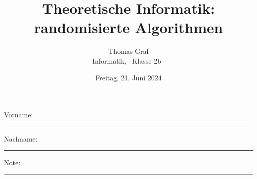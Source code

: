 \newtoggle{withbonus}  %

\newcommand{\mycourse}{Informatik}
\newcommand{\myclass}{\faPeace\faIceCream~Klasse 2b~\faIceCream\faPeace}
\newcommand{\mydate}{Freitag, 21. Juni 2024}

\title{\textbf{Theoretische Informatik: randomisierte Algorithmen}}
\author{Thomas Graf\\
\mycourse, \myclass}
\date{\mydate}
\maketitle
\thispagestyle{headandfoot}		

\begin{center}
\end{center}
\vspace{10mm}

\begin{center}
	Vorname: \rule{45mm}{0.8pt}\qquad Nachname: \rule{45mm}{0.8pt}
\end{center}
\vspace{20mm}

\begin{center}
	\iftoggle{withbonus} {
		\combinedgradetable[h][questions]
	} {
		\gradetable[h][questions]
	}
\end{center}
\vspace{15mm}
\begin{center}
	Note: 
	\vspace{10mm}
	
	\rule{8mm}{1.2pt}
\end{center}
\clearpage


